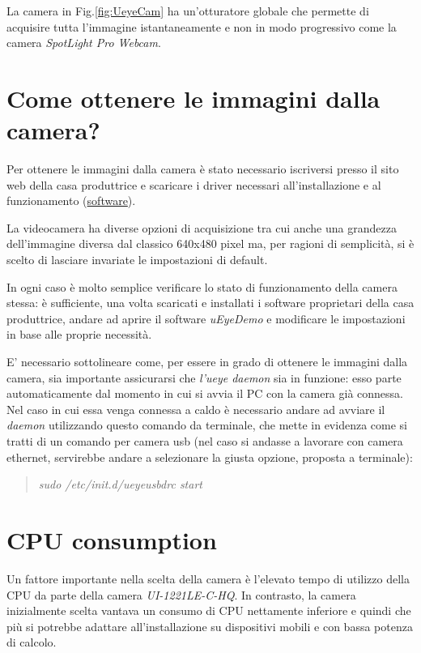 La camera in Fig.\ref{fig:UeyeCam} ha un'otturatore globale che permette di acquisire tutta l'immagine istantaneamente e non in modo progressivo come la camera  \textit{SpotLight Pro Webcam}.

\section{Come ottenere le immagini dalla camera?}
Per ottenere le immagini dalla camera è stato necessario iscriversi presso il sito web della casa produttrice e scaricare i driver necessari all'installazione e al funzionamento (\href{https://en.ids-imaging.com/manuals-ueye-software.html}{software}).

La videocamera ha diverse opzioni di acquisizione tra cui anche una grandezza dell'immagine diversa dal classico 640x480 pixel ma, per ragioni di semplicità, si è scelto di lasciare invariate le impostazioni di default.

In ogni caso è molto semplice verificare lo stato di funzionamento della camera stessa: è sufficiente, una volta scaricati e installati i software proprietari della casa produttrice, andare ad aprire il software \textit{uEyeDemo} e modificare le impostazioni in base alle proprie necessità.

E' necessario sottolineare come, per essere in grado di ottenere le immagini dalla camera, sia importante assicurarsi che \textit{l'ueye daemon} sia in funzione: esso parte automaticamente dal momento in cui si avvia il PC con la camera già connessa. Nel caso in cui essa venga connessa a caldo è necessario andare ad avviare il \textit{daemon} utilizzando questo comando da terminale, che mette in evidenza come si tratti di un comando per camera usb (nel caso si andasse a lavorare con camera ethernet, servirebbe andare a selezionare la giusta opzione, proposta a terminale):

\begin{quotation}
	\textsl{sudo /etc/init.d/ueyeusbdrc start}
\end{quotation}


\section{CPU consumption}
Un fattore importante nella scelta della camera è l'elevato tempo di utilizzo della CPU da parte della camera \textit{UI-1221LE-C-HQ}. In contrasto, la camera inizialmente scelta vantava un consumo di CPU nettamente inferiore e quindi che più si potrebbe adattare all'installazione su dispositivi mobili e con bassa potenza di calcolo.

